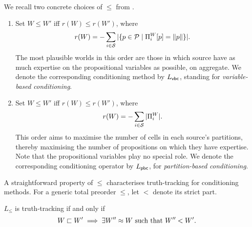 
\begin{example}
    \label{ex_conditioning_operators}
    We recall two concrete choices of $\le$ from
    \textcite{singleton_booth_22_preprint}.

    \begin{enumerate}
        \item Set $W \le W'$ iff $r(W) \le r(W')$, where
              \[
                  r(W) = -\sum_{i \in \mathcal{S}} |\{
                      p \in \mathcal{P}
                      \mid
                      \Pi^W_i[p] = \|{p}\|
                  \}|.
              \]
              The most plausible worlds in this order are those in which
              source have as much expertise on the propositional variables as
              possible, on aggregate. We denote the corresponding conditioning
              method by $L_{\mathsf{vbc}}{}$, standing for \emph{variable-based
              conditioning}.

        \item Set $W \le W'$ iff $r(W) \le r(W')$, where
              \[
                  r(W) = -\sum_{i \in \mathcal{S}} |\Pi^W_i|.
              \]
              This order aims to maximise the number of cells in each source's
              partitions, thereby maximising the number of propositions on
              which they have expertise. Note that the propositional variables
              play no special role. We denote the corresponding conditioning
              operator by $L_{\mathsf{pbc}}{}$, for \emph{partition-based conditioning}.
    \end{enumerate}

\end{example}

A straightforward property of $\le$ characterises truth-tracking for
conditioning methods. For a generic total preorder $\le$, let $<$ denote its
strict part.

\begin{theorem}
    \label{thm_conditioning_tt_characterisation}
    $L_{\le}$ is truth-tracking if and only if
    \begin{equation}
        \label{eq_conditioning_tt_characterisation}
        W \sqsubset W'
            \implies
                \exists W'' \approx W \text{ such that }
                    W'' < W'.
    \end{equation}
\end{theorem}

